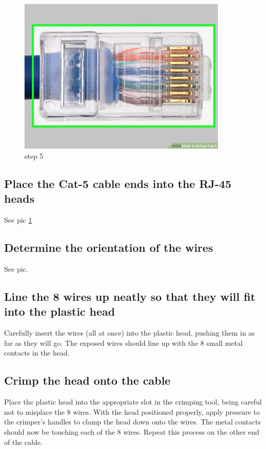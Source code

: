\documentclass[a4paper,12pt]{book}
\begin{document}
\begin{figure}
\centering
\includegraphics[width= 10cm]{./step5.JPG}
\caption{step 5}\label{fig:step5}
\end{figure}

\subsection{Place the Cat-5 cable ends into the RJ-45 heads}
See pic \ref{fig:step5}

\subsection{Determine the orientation of the wires}
See pic.

\subsection{Line the 8 wires up neatly so that they will fit into the plastic head}
Carefully insert the wires (all at once) into the plastic head, pushing them in as far as they will go. The exposed wires should line up with the 8 small metal contacts in the head.

\subsection{Crimp the head onto the cable}
Place the plastic head into the appropriate slot in the crimping tool, being careful not to misplace the 8 wires. With the head positioned properly, apply pressure to the crimper's handles to clamp the head down onto the wires. The metal contacts should now be touching each of the 8 wires. Repeat this process on the other end of the cable.
\end{document}
